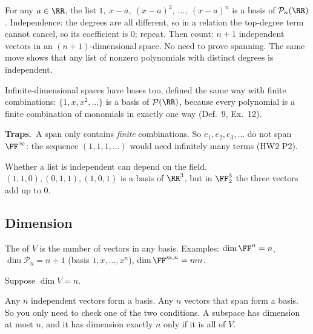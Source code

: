 \documentclass[11pt]{scrartcl}
\newcommand{\PP}{\mathcal P}
\newcommand{\traps}{\par\medskip\noindent\textbf{\color{RawSienna}Traps.}\ }
\begin{document}
\begin{example*}
  For any $a\in\RR$, the list $1,\ x-a,\ (x-a)^2,\ \dots,\ (x-a)^n$ is a basis of $\PP_n(\RR)$.
  Independence: the degrees are all different, so in a relation the top-degree term cannot cancel, so its coefficient is $0$; repeat.
  Then count: $n+1$ independent vectors in an $(n+1)$-dimensional space. No need to prove spanning.
  The same move shows that any list of nonzero polynomials with distinct degrees is independent.
\end{example*}

Infinite-dimensional spaces have bases too, defined the same way with finite combinations: $\{1,x,x^2,\dots\}$ is a basis of $\PP(\RR)$, because every polynomial is a finite combination of monomials in exactly one way (Def.~9, Ex.~12).

\traps A span only contains \emph{finite} combinations. So $e_1,e_2,e_3,\dots$ do not span $\FF^\infty$: the sequence $(1,1,1,\dots)$ would need infinitely many terms (HW2 P2).

Whether a list is independent can depend on the field. $(1,1,0),(0,1,1),(1,0,1)$ is a basis of $\RR^3$, but in $\FF_2^3$ the three vectors add up to $0$.

\subsection{Dimension}
The  of $V$ is the number of vectors in any basis.
Examples: $\dim\FF^n=n$, $\dim\PP_n=n+1$ (basis $1,x,\dots,x^n$), $\dim\FF^{m,n}=mn$.

\begin{proposition*}[LADR 2.38, 2.39, 2.42]
  Suppose $\dim V=n$.
  \begin{itemize}
    \ii Any $n$ independent vectors form a basis. Any $n$ vectors that span form a basis. So you only need to check one of the two conditions.
    \ii A subspace has dimension at most $n$, and it has dimension exactly $n$ only if it is all of $V$.
  \end{itemize}
\end{proposition*}
\end{document}
